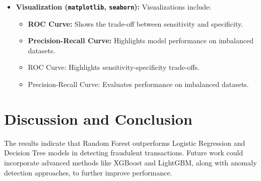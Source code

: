 \documentclass[journal]{IEEEtran}
\begin{document}
\begin{itemize}
    \item \textbf{Visualization (\texttt{matplotlib}, \texttt{seaborn}):} Visualizations include:
    \begin{itemize}
        \item \textbf{ROC Curve:} Shows the trade-off between sensitivity and specificity.
        \item \textbf{Precision-Recall Curve:} Highlights model performance on imbalanced datasets.
 

        \item ROC Curve: Highlights sensitivity-specificity trade-offs.
        \item Precision-Recall Curve: Evaluates performance on imbalanced datasets.
    \end{itemize}
\end{itemize}

\section{Discussion and Conclusion}
The results indicate that Random Forest outperforms Logistic Regression and Decision Tree models in detecting fraudulent transactions. Future work could incorporate advanced methods like XGBoost and LightGBM, along with anomaly detection approaches, to further improve performance.
\end{document}
